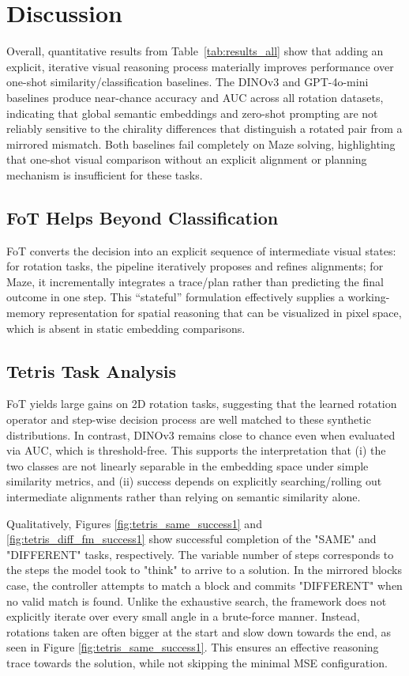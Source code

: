 \documentclass{l4proj}
\begin{document}
\section{Discussion}

Overall, quantitative results from Table~\ref{tab:results_all} show that adding an explicit, iterative visual reasoning process materially improves performance over one-shot similarity/classification baselines. The DINOv3 and GPT-4o-mini baselines produce near-chance accuracy and AUC across all rotation datasets, indicating that global semantic embeddings and zero-shot prompting are not reliably sensitive to the chirality differences that distinguish a rotated pair from a mirrored mismatch. Both baselines fail completely on Maze solving, highlighting that one-shot visual comparison without an explicit alignment or planning mechanism is insufficient for these tasks.

\subsection{FoT Helps Beyond Classification}
FoT converts the decision into an explicit sequence of intermediate visual states: for rotation tasks, the pipeline iteratively proposes and refines alignments; for Maze, it incrementally integrates a trace/plan rather than predicting the final outcome in one step. This ``stateful'' formulation effectively supplies a working-memory representation for spatial reasoning that can be visualized in pixel space, which is absent in static embedding comparisons.

\subsection{Tetris Task Analysis}
FoT yields large gains on 2D rotation tasks, suggesting that the learned rotation operator and step-wise decision process are well matched to these synthetic distributions. In contrast, DINOv3 remains close to chance even when evaluated via AUC, which is threshold-free. This supports the interpretation that (i) the two classes are not linearly separable in the embedding space under simple similarity metrics, and (ii) success depends on explicitly searching/rolling out intermediate alignments rather than relying on semantic similarity alone.

Qualitatively, Figures \ref{fig:tetris_same_success1} and \ref{fig:tetris_diff_fm_success1} show successful completion of the "SAME" and "DIFFERENT" tasks, respectively. The variable number of steps corresponds to the steps the model took to "think" to arrive to a solution. In the mirrored blocks case, the controller attempts to match a block and commits "DIFFERENT" when no valid match is found. Unlike the exhaustive search, the framework does not explicitly iterate over every small angle in a brute-force manner. Instead, rotations taken are often bigger at the start and slow down towards the end, as seen in Figure \ref{fig:tetris_same_success1}. This ensures an effective reasoning trace towards the solution, while not skipping the minimal MSE configuration.
\end{document}
